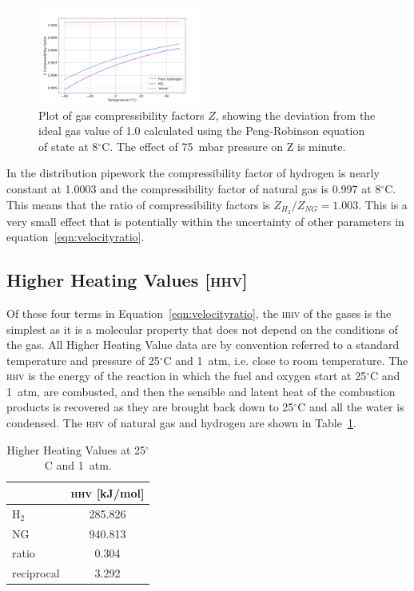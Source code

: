 \documentclass[5p]{elsarticle} %
\begin{document}
\begin{figure}[htbp]
\centering
\includegraphics[width=0.48\textwidth]{peng_z.png}
\caption{Plot of gas compressibility factors $Z$, showing the deviation from the ideal gas value of 1.0 calculated using the Peng-Robinson equation of state at 8$^\circ$C\citep{Sargents_github}. The effect of 75~mbar pressure on Z is minute.}
\label{fig:peng_z}
\end{figure}

In the distribution pipework the compressibility factor of hydrogen is nearly constant at 1.0003 and the compressibility factor of natural gas is 0.997 at 8$^\circ$C\citep{Sargents_github}.  
This means that the ratio of compressibility factors is $Z_{H_2} / Z_{NG} = 1.003$.
This is a very small effect that is potentially within the uncertainty of other parameters in equation~\eqref{eqn:velocityratio}.

\subsection{Higher Heating Values \textsc{[\textsc{hhv}]}}
\label{sec:hhv}

Of these four terms in Equation~\eqref{eqn:velocityratio}, the \textsc{hhv} of the gases is the simplest as it is a molecular property that does not depend on the conditions of the gas.
All Higher Heating Value data are by convention referred to a standard temperature and pressure of 25$^\circ$C and 1~atm, i.e. close to room temperature.
The \textsc{hhv} is the energy of the reaction in which the fuel and oxygen start at 25$^\circ$C and 1~atm, are combusted, and then the sensible and latent heat of the combustion products is recovered as they are brought back down to 25$^\circ$C and all the water is condensed\citep{nist_delta_H}. 
The \textsc{hhv} of natural gas and hydrogen are shown in Table~\ref{tab:combust}.

\begin{table}[ht]
\centering
\begin{tabular}{l|c}
    & \textsc{hhv} [kJ/mol]\\
    \hline
    H$_2$ & 285.826 \\
    NG & 940.813 \\
    \hline
    ratio & 0.304  \\
    reciprocal & 3.292 \\
\end{tabular}
\caption{\label{tab:combust}Higher Heating Values at 25$^\circ$C and 1~atm.} 
\end{table}
\end{document}

